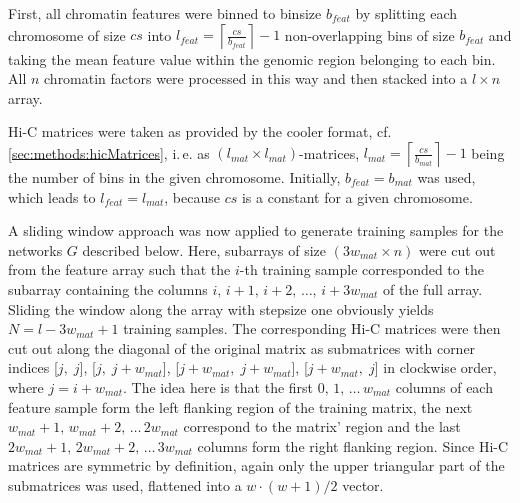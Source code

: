 First, all chromatin features were binned to binsize $b_{feat}$ by splitting each chromosome of size $cs$ into 
$l_{feat}=\left \lceil{\frac{cs}{b_{feat}}}\right \rceil -1$ non-overlapping bins of size $b_{feat}$
and taking the mean feature value within the genomic region belonging to each bin.
All $n$ chromatin factors were processed in this way and then stacked into a $l \times n$ array.

Hi-C matrices were taken as provided by the cooler format, cf. \cref{sec:methods:hicMatrices}, 
i.\,e. as $(l_{mat} \times l_{mat})$-matrices, $l_{mat}=\left \lceil{\frac{cs}{b_{mat}}}\right \rceil -1$ being the number of bins in the given chromosome. 
Initially, $b_{feat} = b_{mat}$ was used, which leads to $l_{feat} = l_{mat}$, because $cs$ is a constant for a given chromosome.

A sliding window approach was now applied to generate training samples for the networks $G$ described below.
Here, subarrays of size $(3w_{mat} \times n)$ were cut out from the feature array 
such that the $i$-th training sample corresponded to the subarray containing the columns $i,\,i+1,\,i+2,\,\dots,\,i+3w_{mat}$ of the full array. 
Sliding the window along the array with stepsize one obviously yields $N=l-3w_{mat}+1$ training samples.
The corresponding Hi-C matrices were then cut out along the diagonal of the original matrix 
as submatrices with corner indices [$j,\;j$], [$j,\;j+w_{mat}$], [$j+w_{mat},\;j+w_{mat}$], [$j+w_{mat},\;j$] in clockwise order, where $j=i+w_{mat}$.
The idea here is that the first $0,\,1,\,\dots \,w_{mat}$ columns of each feature sample form the left flanking region of the training matrix, 
the next $w_{mat}+1,\,w_{mat}+2,\,\dots \,2w_{mat}$ correspond to the matrix' region and the last $2w_{mat}+1,\,2w_{mat}+2,\,\dots \,3w_{mat}$ columns form the right flanking region.
Since Hi-C matrices are symmetric by definition, again only the upper triangular part of the submatrices was used, 
flattened into a $w\cdot (w+1)/2$ vector.

